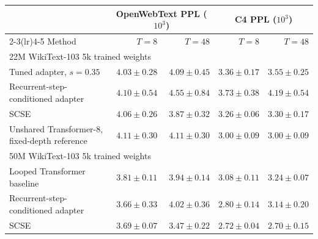 \documentclass[letterpaper]{article} %
\newcommand{\SCSE}{\textsc{SCSE}}
\theoremstyle{remark}
\begin{document}
\begin{table}[t!]
	\centering
	\scriptsize
	\begin{tabular}{lrrrr}
		\toprule
		                                              & \multicolumn{2}{c}{OpenWebText PPL ($10^3$)} & \multicolumn{2}{c}{C4 PPL ($10^3$)}                                                   \\
		\cmidrule(lr){2-3}\cmidrule(lr){4-5}
		Method                                        & $T=8$                                        & $T=48$                              & $T=8$                  & $T=48$                 \\
		\midrule
		\multicolumn{5}{l}{22M WikiText-103 5k trained weights}                                                                                                                              \\
		Tuned adapter, $s=0.35$                       & $\mathbf{4.03\pm0.28}$                       & $4.09\pm0.45$                       & $3.36\pm0.17$          & $3.55\pm0.25$          \\
		Recurrent-step-conditioned adapter            & $4.10\pm0.54$                                & $4.55\pm0.84$                       & $3.73\pm0.38$          & $4.19\pm0.54$          \\
		\SCSE{}                                       & $4.06\pm0.26$                                & $\mathbf{3.87\pm0.32}$              & $\mathbf{3.26\pm0.06}$ & $\mathbf{3.30\pm0.17}$ \\
		\addlinespace[2pt]
		Unshared Transformer-8, fixed-depth reference & $4.11\pm0.30$                                & $4.11\pm0.30$                       & $3.00\pm0.09$          & $3.00\pm0.09$          \\
		\midrule
		\multicolumn{5}{l}{50M WikiText-103 5k trained weights}                                                                                                                              \\
		Looped Transformer baseline                   & $3.81\pm0.11$                                & $3.94\pm0.14$                       & $3.08\pm0.11$          & $3.24\pm0.07$          \\
		Recurrent-step-conditioned adapter            & $\mathbf{3.66\pm0.33}$                       & $4.02\pm0.36$                       & $2.80\pm0.14$          & $3.14\pm0.20$          \\
		\SCSE{}                                       & $3.69\pm0.07$                                & $\mathbf{3.47\pm0.22}$              & $\mathbf{2.72\pm0.04}$ & $\mathbf{2.70\pm0.15}$ \\

\end{tabular}
\end{table}
\end{document}
